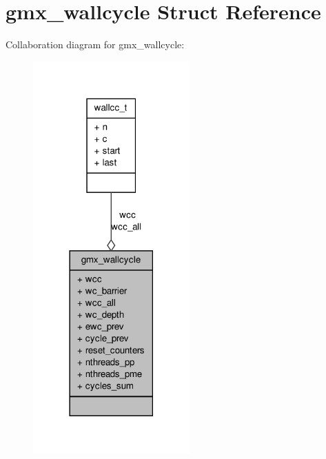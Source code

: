\hypertarget{structgmx__wallcycle}{\section{gmx\-\_\-wallcycle \-Struct \-Reference}
\label{structgmx__wallcycle}
}


\-Collaboration diagram for gmx\-\_\-wallcycle\-:
\nopagebreak
\begin{figure}[H]
\begin{center}
\leavevmode
\includegraphics[width=170pt]{structgmx__wallcycle__coll__graph}
\end{center}
\end{figure}
